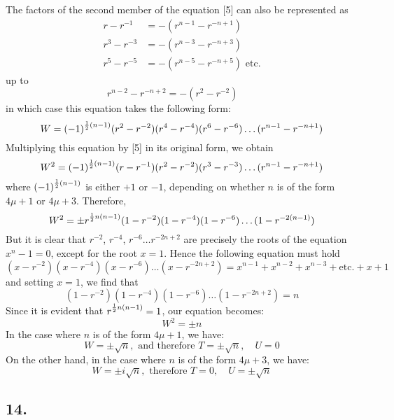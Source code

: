 \documentclass[twoside,12pt]{memoir}
\let\oldfrac\frac
\def\frac#1#2{\mathchoice{\tfrac{#1}{#2}}{\oldfrac{#1}{#2}}{\genfrac{}{}{}{2}{#1}{#2\mathstrut}}{\genfrac{}{}{}{3}{#1}{#2\mathstrut}}}
\begin{document}
The factors of the second member of the equation [5] can also be represented as
\[\begin{aligned}
r-r^{-1} & =-(r^{n-1}-r^{-n+1}) \\
r^{3}-r^{-3} & =-(r^{n-3}-r^{-n+3}) \\
r^{5}-r^{-5} & =-(r^{n-5}-r^{-n+5}) \text{ etc{.}}
\end{aligned}\]
up to
\[r^{n-2}-r^{-n+2}=-(r^{2}-r^{-2})\phantom{\text{ etc{.}}}\]
in which case this equation takes the following form:
\[W=(-1)^{\frac{1}{2}(n-1)}(r^{2}-r^{-2})(r^{4}-r^{-4})(r^{6}-r^{-6}) \ldots (r^{n-1}-r^{-n+1})\]
Multiplying this equation by [5] in its original form, we obtain
\[W^{2}=(-1)^{\frac{1}{2}(n-1)}(r-r^{-1})(r^{2}-r^{-2})(r^{3}-r^{-3}) \ldots (r^{n-1}-r^{-n+1})\]
where \((-1)^{\frac{1}{2}(n-1)}\) is either \(+1\) or \(-1\), depending on whether \(n\) is of the form \(4 \mu+1\) or \(4 \mu+3\). Therefore,
\[W^{2}= \pm r^{\frac{1}{2} n(n-1)}(1-r^{-2})(1-r^{-4})(1-r^{-6}) \ldots(1-r^{-2(n-1)})\]
But it is clear that \(r^{-2}\), \(r^{-4}\), \(r^{-6} \ldots r^{-2 n+2}\) are precisely the roots of the equation \(x^{n}-1=0\), except for the root \(x=1\). Hence the following equation must hold
\[(x-r^{-2})(x-r^{-4})(x-r^{-6}) \ldots(x-r^{-2 n+2})=x^{n-1}+x^{n-2}+x^{n-3}+\text{etc{.}}+x+1\]
and setting \(x=1\), we find that
\[(1-r^{-2})(1-r^{-4})(1-r^{-6}) \ldots(1-r^{-2 n+2})=n\]
Since it is evident that \(r^{\frac{1}{2} n(n-1)}=1\), our equation becomes:
\[W^{2}= \pm n \tag{6}\]
In the case where \(n\) is of the form \(4 \mu+1\), we have:
\[W= \pm \sqrt{n}, \text{ and therefore } T= \pm \sqrt{n}, \quad U=0\]
On the other hand, in the case where \(n\) is of the form \(4 \mu+3\), we have:
\[W= \pm i \sqrt{n}, \text{ therefore } T=0, \quad U= \pm \sqrt{n}\]
%

\subsection*{14.}
\end{document}
